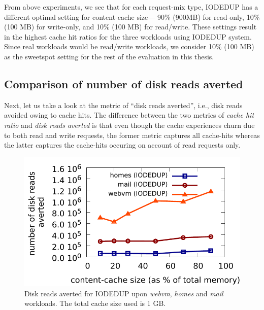 From above experiments, we see that for each request-mix type, IODEDUP has a
different optimal setting for content-cache size---
90\% (900MB) for read-only,
10\% (100 MB) for write-only, and
10\% (100 MB) for read/write.
These settings result in the highest cache hit
ratios for the three workloads using IODEDUP system. Since real
workloads would be read/write workloads, we consider 10\% (100 MB) as
the sweetspot setting for the rest of the evaluation in this thesis.

\subsection{Comparison of number of disk reads averted}
Next, let us take
a look at the metric of ``disk reads averted'', i.e., disk reads avoided owing
to cache hits. 
The difference between the two metrics of \textit{cache hit
ratio} and 
\textit{disk reads averted} 
is that even though the cache
experiences churn due to both read and write requests, the former metric
captures all cache-hits whereas the latter captures the cache-hits
occuring on account of read requests only.

\begin{figure}
    \centering
    \includegraphics[scale=0.65]{confided-figures/sweetspot/reads-writes/sweetspotaverted-reads-n-writes.pdf}
\caption{Disk reads averted for IODEDUP upon \textit{webvm}, \textit{homes} and \textit{mail} workloads. The total cache size used is 1 GB.}
\label{fig:sweetspot-averted}
\end{figure}

